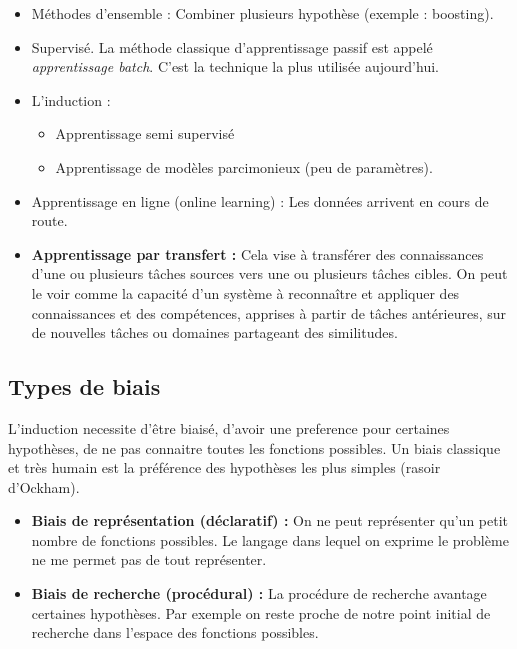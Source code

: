 \documentclass{article}
\begin{document}
\begin{itemize}

\item Méthodes d'ensemble : Combiner plusieurs hypothèse (exemple : boosting).

\item Supervisé. La méthode classique d'apprentissage passif est appelé \textit{apprentissage batch}. C'est la technique la plus utilisée aujourd'hui.

\item L'induction :
    \begin{itemize}
    \item Apprentissage semi supervisé 
    \item Apprentissage de modèles parcimonieux (peu de paramètres).
    \end{itemize}

\item Apprentissage en ligne (online learning) : Les données arrivent en cours de route.

\item \textbf{Apprentissage par transfert :} Cela vise à transférer des connaissances d'une ou plusieurs tâches sources vers une ou plusieurs tâches cibles. On peut le voir comme la capacité d’un système à reconnaître et appliquer des connaissances et des compétences, apprises à partir de tâches antérieures, sur de nouvelles tâches ou domaines partageant des similitudes.

\end{itemize}

\subsection{Types de biais}

L'induction necessite d'être biaisé, d'avoir une preference pour certaines hypothèses, de ne pas connaitre toutes les fonctions possibles. Un biais classique et très humain est la préférence des hypothèses les plus simples (rasoir d'Ockham).

\begin{itemize}
\item \textbf{Biais de représentation (déclaratif) :} On ne peut représenter qu'un petit nombre de fonctions possibles. Le langage dans lequel on exprime le problème ne me permet pas de tout représenter.
\item \textbf{Biais de recherche (procédural) :} La procédure de recherche avantage certaines hypothèses. Par exemple on reste proche de notre point initial de recherche dans l'espace des fonctions possibles.
\end{itemize}
\end{document}
